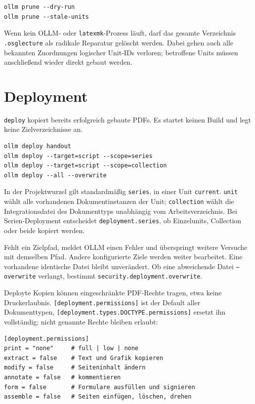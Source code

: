 \documentclass[
load-preamble+
]{osgdoc}
\begin{document}
\begin{verbatim}
ollm prune --dry-run
ollm prune --stale-units
\end{verbatim}

Wenn kein OLLM- oder \texttt{latexmk}-Prozess läuft, darf das gesamte
Verzeichnis \texttt{.osglecture} als radikale Reparatur gelöscht werden. Dabei
gehen auch alle bekannten Zuordnungen logischer Unit-IDs verloren; betroffene
Units müssen anschließend wieder direkt gebaut werden.

\section{Deployment}

\texttt{deploy} kopiert bereits erfolgreich gebaute PDFs. Es startet
keinen Build und legt keine Zielverzeichnisse an.

\begin{verbatim}
ollm deploy handout
ollm deploy --target=script --scope=series
ollm deploy --target=script --scope=collection
ollm deploy --all --overwrite
\end{verbatim}

In der Projektwurzel gilt standardmäßig \texttt{series}, in einer Unit
\texttt{current}. \texttt{unit} wählt alle vorhandenen Dokumentinstanzen der Unit;
\texttt{collection} wählt die Integrationsdatei des Dokumenttyps unabhängig
vom Arbeitsverzeichnis. Bei Serien-Deployment entscheidet
\verb|deployment.series|, ob Einzelunits, Collection oder beide kopiert
werden.

Fehlt ein Zielpfad, meldet OLLM einen Fehler und überspringt weitere Versuche
mit demselben Pfad. Andere konfigurierte Ziele werden weiter bearbeitet. Eine
vorhandene identische Datei bleibt unverändert. Ob eine abweichende Datei
\texttt{--overwrite} verlangt, bestimmt \verb|security.deployment.overwrite|.

Deployte Kopien können eingeschränkte PDF-Rechte tragen, etwa keine
Druckerlaubnis. \verb|[deployment.permissions]| ist der Default aller
Dokumenttypen, \verb|[deployment.types.DOCTYPE.permissions]| ersetzt ihn
vollständig; nicht genannte Rechte bleiben erlaubt:

\begin{verbatim}
[deployment.permissions]
print = "none"     # full | low | none
extract = false    # Text und Grafik kopieren
modify = false     # Seiteninhalt ändern
annotate = false   # kommentieren
form = false       # Formulare ausfüllen und signieren
assemble = false   # Seiten einfügen, löschen, drehen
\end{verbatim}
\end{document}
